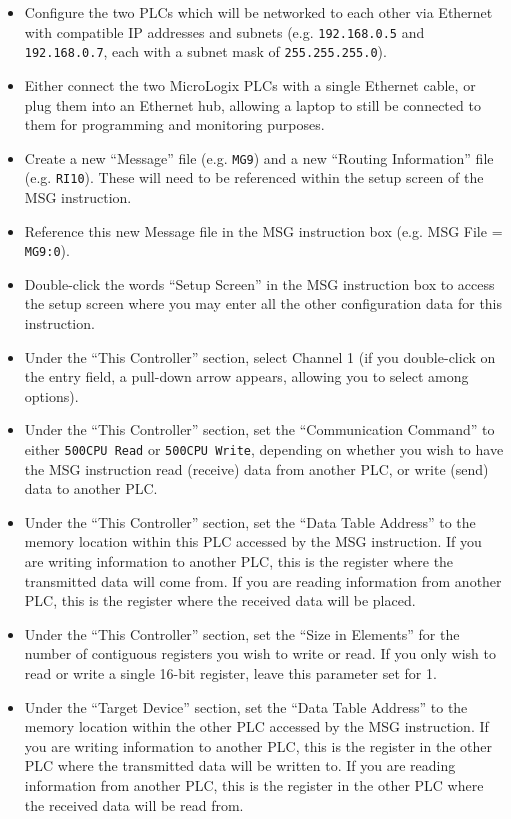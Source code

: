 \documentclass[12pt,a4paper]{article}
\begin{document}
\begin{itemize}
\item{} Configure the two PLCs which will be networked to each other via Ethernet with compatible IP addresses and subnets (e.g. {\tt 192.168.0.5} and {\tt 192.168.0.7}, each with a subnet mask of {\tt 255.255.255.0}).
\vskip 5pt
\item{} Either connect the two MicroLogix PLCs with a single Ethernet cable, or plug them into an Ethernet hub, allowing a laptop to still be connected to them for programming and monitoring purposes.
\vskip 5pt
\item{} Create a new ``Message'' file (e.g. {\tt MG9}) and a new ``Routing Information'' file (e.g. {\tt RI10}).  These will need to be referenced within the setup screen of the MSG instruction.
\vskip 5pt
\item{} Reference this new Message file in the MSG instruction box (e.g. MSG File = {\tt MG9:0}).
\vskip 5pt
\item{} Double-click the words ``Setup Screen'' in the MSG instruction box to access the setup screen where you may enter all the other configuration data for this instruction.
\vskip 5pt
\item{} Under the ``This Controller'' section, select Channel 1 (if you double-click on the entry field, a pull-down arrow appears, allowing you to select among options).
\vskip 5pt
\item{} Under the ``This Controller'' section, set the ``Communication Command'' to either {\tt 500CPU Read} or {\tt 500CPU Write}, depending on whether you wish to have the MSG instruction read (receive) data from another PLC, or write (send) data to another PLC.
\vskip 5pt
\item{} Under the ``This Controller'' section, set the ``Data Table Address'' to the memory location within this PLC accessed by the MSG instruction.  If you are writing information to another PLC, this is the register where the transmitted data will come from.  If you are reading information from another PLC, this is the register where the received data will be placed.
\vskip 5pt
\item{} Under the ``This Controller'' section, set the ``Size in Elements'' for the number of contiguous registers you wish to write or read.  If you only wish to read or write a single 16-bit register, leave this parameter set for 1.
\vskip 5pt
\item{} Under the ``Target Device'' section, set the ``Data Table Address'' to the memory location within the other PLC accessed by the MSG instruction.  If you are writing information to another PLC, this is the register in the other PLC where the transmitted data will be written to.  If you are reading information from another PLC, this is the register in the other PLC where the received data will be read from.

\end{itemize}
\end{document}
